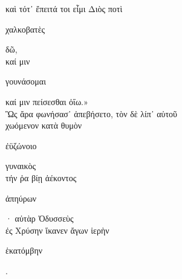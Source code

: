 \documentclass{ransom}
\begin{document}
\begin{foreignpage}
\begin{graytext}
καὶ τότ᾽ ἔπειτά τοι εἶμι Διὸς ποτὶ \begin{whitetext}χαλκοβατὲς\end{whitetext} δῶ,\\
καί μιν \begin{whitetext}γουνάσομαι\end{whitetext} καί μιν πείσεσθαι ὀΐω.»\\
Ὣς ἄρα φωνήσασ᾽ ἀπεβήσετο, τὸν δὲ λίπ᾽ αὐτοῦ\\
χωόμενον κατὰ θυμὸν \begin{whitetext}ἐϋζώνοιο\end{whitetext} γυναικὸς\\
τήν ῥα βίῃ ἀέκοντος \begin{whitetext}ἀπηύρων\end{whitetext}· αὐτὰρ Ὀδυσσεὺς\hfill{}\\
ἐς Χρύσην ἵκανεν ἄγων ἱερὴν \begin{whitetext}ἑκατόμβην\end{whitetext}.\\

\end{graytext}


\end{foreignpage}
\end{document}
